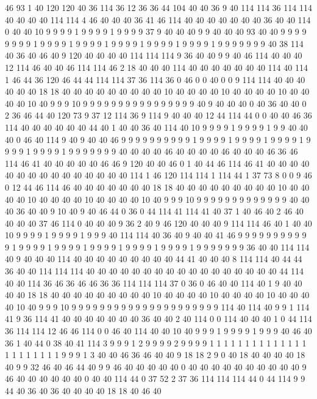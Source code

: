 46 93 1 40 120 120 40 36 114 36 12 36 36 44 104 40 40 36 9 40
114 114 36 114 114 40 40 40 40 114 114 4 46 40 40 40 36 41 46 114
40 40 40 40 40 40 40 36 40 40 114 0 40 40 10 9 9 9 9 1
9 9 9 9 1 9 9 9 9 37 9 40 40 40 9 9 40 40 40 93
40 40 9 9 9 9 9 9 9 9 1 9 9 9 9 1 9 9 9 9
1 9 9 9 9 1 9 9 9 9 1 9 9 9 9 1 9 9 9 9
9 9 9 40 38 114 40 36 40 46 40 9 120 40 40 40 40 114 114 114
9 36 40 40 9 9 40 46 114 40 40 40 12 114 46 40 40 46 114 114
46 2 18 40 40 40 114 40 40 40 40 40 40 40 114 40 114 1 46 44
36 120 46 44 44 114 114 37 36 114 36 0 46 0 0 40 0 0 9 114
114 40 40 40 40 40 40 18 18 40 40 40 40 40 40 40 40 40 10 40
40 40 40 10 40 40 40 40 10 40 40 40 40 10 40 9 9 9 10 9
9 9 9 9 9 9 9 9 9 9 9 9 9 9 9 40 9 40 40 40
0 40 36 40 40 0 2 36 46 44 40 120 73 9 37 12 114 36 9 114
9 40 40 40 12 44 114 44 0 0 40 40 46 36 114 40 40 40 40 40
40 44 40 1 40 40 36 40 114 40 10 9 9 9 9 1 9 9 9 9
1 9 9 40 40 40 0 46 40 114 9 40 9 40 40 46 9 9 9 9
9 9 9 9 9 9 1 9 9 9 9 1 9 9 9 9 1 9 9 9
9 1 9 9 9 9 1 9 9 9 9 1 9 9 9 9 9 9 9 40
40 40 40 46 40 40 40 40 46 40 40 40 46 36 46 114 46 41 40 40
40 40 40 46 46 9 120 40 40 46 0 1 40 44 46 114 46 41 40 40
40 40 40 40 40 40 40 40 40 40 40 40 40 114 1 46 120 114 114 1
114 44 1 37 73 8 0 0 9 46 0 12 44 46 114 46 40 40 40 40
40 40 40 18 18 40 40 40 40 40 40 40 40 40 10 40 40 40 40 10
40 40 40 40 10 40 40 40 40 10 40 9 9 9 10 9 9 9 9 9
9 9 9 9 9 9 9 9 40 40 40 36 40 40 9 10 40 9 40 46
44 0 36 0 44 114 41 114 41 40 37 1 40 46 40 2 46 40 40 40
40 37 46 114 0 40 40 40 9 36 2 40 9 46 120 40 40 40 9 114
114 46 40 1 40 40 10 9 9 9 9 1 9 9 9 9 1 9 9 9
40 114 114 40 36 40 9 40 40 41 46 9 9 9 9 9 9 9 9 9
9 9 1 9 9 9 9 1 9 9 9 9 1 9 9 9 9 1 9 9
9 9 1 9 9 9 9 1 9 9 9 9 9 9 9 36 40 40 114 114
40 9 40 40 40 114 40 40 40 40 40 40 40 40 40 44 41 40 40 40
8 114 114 40 44 44 36 40 40 114 114 114 40 40 40 40 40 40 40 40
40 40 40 40 40 40 40 40 40 44 114 40 40 114 36 46 36 46 46 36
36 114 114 114 37 0 36 0 46 40 40 114 40 1 9 40 40 40 40 18
18 40 40 40 40 40 40 40 40 40 10 40 40 40 40 10 40 40 40 40
10 40 40 40 40 10 40 9 9 9 10 9 9 9 9 9 9 9 9 9
9 9 9 9 9 9 9 9 9 9 9 9 114 40 114 40 9 9 1 114
41 9 36 114 41 40 40 40 40 40 40 40 36 40 40 2 40 114 0 0
114 40 40 40 1 0 44 114 36 114 114 12 46 46 114 0 0 46 40 114
40 40 10 40 9 9 9 1 9 9 9 9 1 9 9 9 40 46 40 36
1 40 44 0 38 40 41 114 3 9 9 9 1 2 9 9 9 9 2 9
9 9 9 1 1 1 1 1 1 1 1 1 1 1 1 1 1 1 1 1
1 1 1 1 1 9 9 9 1 3 40 40 46 36 46 40 40 9 18 18
2 9 0 40 18 40 40 40 40 18 40 9 9 32 46 40 46 44 40 9
9 46 40 40 40 40 40 0 40 40 40 40 40 40 40 40 40 40 9 46
40 40 40 40 40 40 0 40 40 114 44 0 37 52 2 37 36 114 114 114
44 0 44 114 9 9 44 40 36 40 36 40 40 40 40 18 18 40 46 40
